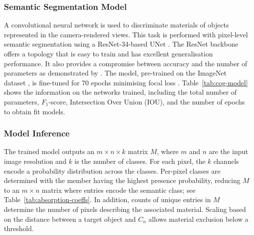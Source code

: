 \subsubsection{Semantic Segmentation Model}
A convolutional neural network is used to discriminate materials of objects represented in the camera-rendered views. This task is performed with pixel-level semantic segmentation using a ResNet-34-based UNet \citep{ronneberger2015u}. The ResNet backbone offers a topology that is easy to train and has excellent generalisation performance. It also provides a compromise between accuracy and the number of parameters as demonstrated by \cite{he2016deep}.
The model, pre-trained on the ImageNet dataset \citep{deng2009imagenet}, is fine-tuned for 70 epochs minimising focal loss \citep{lin2017focal}. Table~\ref{tab:cog-model} shows the information on the networks trained, including the total number of parameters, $F_{1}$\hyp{}score, Intersection Over Union (IOU), and the number of epochs to obtain fit models.


\subsubsection{Model Inference}
The trained model outputs an $m \times n \times k$ matrix $M$, where $m$ and $n$ are the input image resolution and $k$ is the number of classes. For each pixel, the $k$ channels encode a probability distribution across the classes. Per-pixel classes are determined with the member having the highest presence probability, reducing $M$ to an $m \times n$ matrix where entries encode the semantic class; see Table~\ref{tab:absorption-coeffs}. 
In addition, counts of unique entries in $M$ determine the number of pixels describing the associated material. Scaling based on the distance between a target object and $C_n$ allows material exclusion below a threshold.

